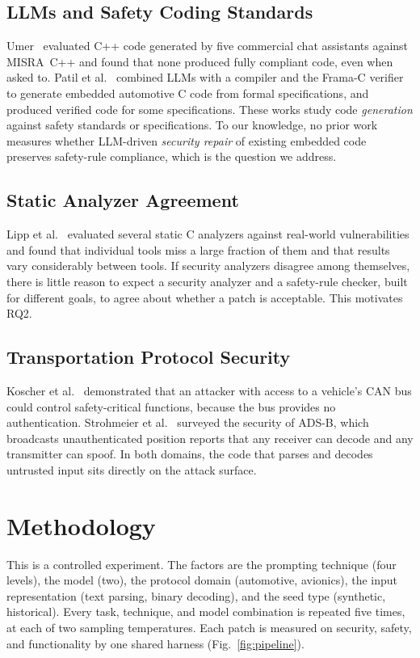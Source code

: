 \documentclass[12pt]{IEEEtran}
\begin{document}
\subsection{LLMs and Safety Coding Standards}
Umer~\cite{umer2025misra} evaluated C++ code generated by five commercial chat assistants against MISRA~C++ and found that none produced fully compliant code, even when asked to. Patil et al.~\cite{patil2024spec2code} combined LLMs with a compiler and the Frama-C verifier to generate embedded automotive C code from formal specifications, and produced verified code for some specifications. These works study code \emph{generation} against safety standards or specifications. To our knowledge, no prior work measures whether LLM-driven \emph{security repair} of existing embedded code preserves safety-rule compliance, which is the question we address.

\subsection{Static Analyzer Agreement}
Lipp et al.~\cite{lipp2022static} evaluated several static C analyzers against real-world vulnerabilities and found that individual tools miss a large fraction of them and that results vary considerably between tools. If security analyzers disagree among themselves, there is little reason to expect a security analyzer and a safety-rule checker, built for different goals, to agree about whether a patch is acceptable. This motivates RQ2.

\subsection{Transportation Protocol Security}
Koscher et al.~\cite{koscher2010experimental} demonstrated that an attacker with access to a vehicle's CAN bus could control safety-critical functions, because the bus provides no authentication. Strohmeier et al.~\cite{strohmeier2015adsb} surveyed the security of ADS-B, which broadcasts unauthenticated position reports that any receiver can decode and any transmitter can spoof. In both domains, the code that parses and decodes untrusted input sits directly on the attack surface.


\section{Methodology}
\label{sec:method}
This is a controlled experiment. The factors are the prompting technique (four levels), the model (two), the protocol domain (automotive, avionics), the input representation (text parsing, binary decoding), and the seed type (synthetic, historical). Every task, technique, and model combination is repeated five times, at each of two sampling temperatures. Each patch is measured on security, safety, and functionality by one shared harness (Fig.~\ref{fig:pipeline}).
\end{document}
